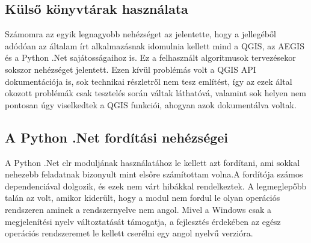 \subsection{Külső könyvtárak használata}
Számomra az egyik legnagyobb nehézséget az jelentette, hogy a jellegéből adódóan az általam írt alkalmazásnak idomulnia kellett mind a QGIS, az AEGIS és a Python .Net sajátosságaihoz is. Ez a felhasznált algoritmusok tervezésekor sokszor nehézséget jelentett. Ezen kívül problémás volt a QGIS API dokumentációja is, sok technikai részletről nem tesz említést, így az ezek által okozott problémák csak tesztelés során váltak láthatóvá, valamint sok helyen nem pontosan úgy viselkedtek a QGIS funkciói, ahogyan azok dokumentálva voltak.
\subsection{A Python .Net fordítási nehézségei}
A Python .Net clr moduljának használatához le kellett azt fordítani, ami sokkal nehezebb feladatnak bizonyult mint elsőre számítottam volna.A fordítója számos dependenciával dolgozik, és ezek nem várt hibákkal rendelkeztek. A legmeglepőbb talán az volt, amikor kiderült, hogy a modul nem fordul le olyan operációs rendszeren aminek a rendszernyelve nem angol. Mivel a Windows csak a megjelenítési nyelv változtatását támogatja, a fejlesztés érdekében az egész operációs rendszeremet le kellett cserélni egy angol nyelvű verzióra.




